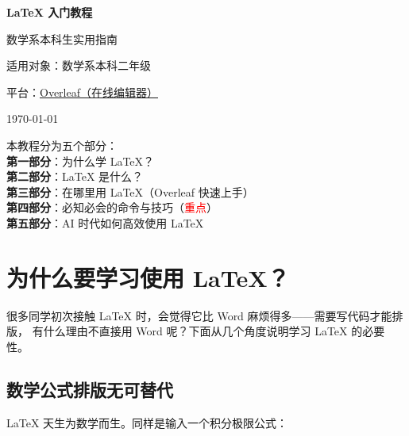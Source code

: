 \documentclass[12pt, a4paper]{article}
\begin{document}

\begin{titlepage}
    \centering
    \vspace*{2cm}
    {\Huge\bfseries \LaTeX{} 入门教程\par}
    \vspace{0.5cm}
    {\Large 数学系本科生实用指南\par}
    \vspace{1.5cm}
    {\large 适用对象：数学系本科二年级\par}
    \vspace{0.5cm}
    {\large 平台：\href{https://www.overleaf.com}{Overleaf（在线编辑器）}\par}
    \vspace{2cm}
    {\large \today\par}
    \vfill
    \begin{tipbox}[阅读指南]
        本教程分为五个部分：\\
        \textbf{第一部分}：为什么学 \LaTeX{}？\\
        \textbf{第二部分}：\LaTeX{} 是什么？\\
        \textbf{第三部分}：在哪里用 \LaTeX{}（Overleaf 快速上手）\\
        \textbf{第四部分}：必知必会的命令与技巧（\textcolor{red}{重点}）\\
        \textbf{第五部分}：AI 时代如何高效使用 \LaTeX{}
    \end{tipbox}
\end{titlepage}

\tableofcontents
\newpage

\section{为什么要学习使用 \LaTeX{}？}

很多同学初次接触 \LaTeX{} 时，会觉得它比 Word 麻烦得多——需要写代码才能排版，
有什么理由不直接用 Word 呢？下面从几个角度说明学习 \LaTeX{} 的必要性。

\subsection{数学公式排版无可替代}

\LaTeX{} 天生为数学而生。同样是输入一个积分极限公式：
\end{document}
